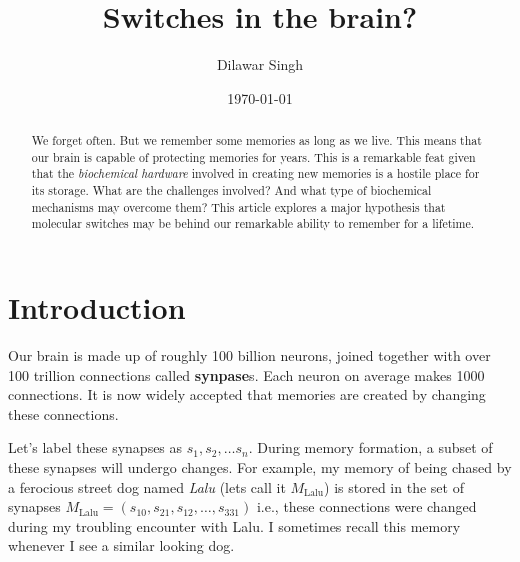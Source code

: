 \documentclass[]{resonance}
\title{Switches in the brain?}
\author{Dilawar Singh}
\date{\today}
\begin{document}
\maketitle



\begin{abstract}

    We forget often. But we remember some memories as long as we live.
    This means that our brain is capable of protecting memories for years.
    This is a remarkable feat given that the \emph{biochemical hardware}
    involved in creating new memories is a hostile place for
    its storage.  What are the challenges involved? And what type of 
    biochemical mechanisms may overcome them? This article explores a major
    hypothesis that molecular switches may be behind our remarkable ability to
    remember for a lifetime.

\end{abstract}

\maketitle
{}

\section{Introduction}\label{sec:intro}

Our brain is made up of roughly 100 billion neurons, joined together with over
100 trillion connections called \textbf{synpase}s. Each neuron on average makes
1000 connections. It is now widely accepted that memories are created by
changing these connections. 

Let's label these synapses as $s_1, s_2, \ldots s_n$. During memory formation, a
subset of these synapses will undergo changes. For example, my memory of being
chased by a ferocious street dog named \emph{Lalu} (lets call it
$M_\text{Lalu}$) is stored in the set of synapses $M_\text{Lalu}=(s_{10},
s_{21}, s_{12},\ldots,s_{331})$ i.e., these connections were changed during my
troubling encounter with Lalu. I sometimes recall this memory whenever I see a
similar looking dog.
\end{document}
